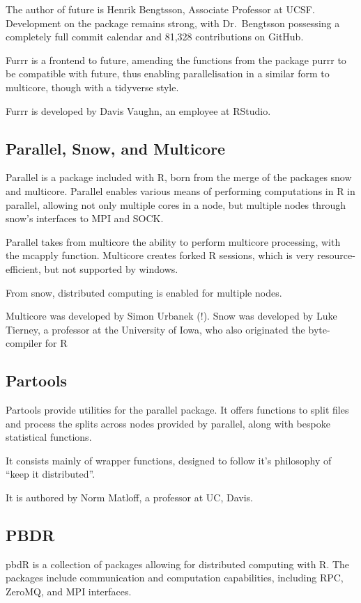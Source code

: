 \documentclass[10pt,a4paper]{article}
\begin{document}
The author of future is Henrik Bengtsson, Associate Professor at UCSF.
Development on the package remains strong, with Dr.~Bengtsson
possessing a completely full commit calendar and 81,328 contributions
on GitHub.

Furrr is a frontend to future, amending the functions from the package
purrr to be compatible with future, thus enabling parallelisation in a
similar form to multicore, though with a tidyverse style.

Furrr is developed by Davis Vaughn, an employee at RStudio.

\subsection{Parallel, Snow, and Multicore}
\label{sec:parall-snow-mult}
Parallel is a package included with R, born from the merge of the
packages snow and multicore. Parallel enables various means of
performing computations in R in parallel, allowing not only multiple
cores in a node, but multiple nodes through snow's interfaces to MPI
and SOCK.

Parallel takes from multicore the ability to perform multicore
processing, with the mcapply function. Multicore creates forked R
sessions, which is very resource-efficient, but not supported by
windows.

From snow, distributed computing is enabled for multiple nodes.

Multicore was developed by Simon Urbanek (!). Snow was developed by
Luke Tierney, a professor at the University of Iowa, who also
originated the byte-compiler for R

\subsection{Partools}
\label{sec:partools}
\nocite{matloff16:_softw_alchem}
Partools provide utilities for the parallel package. It offers
functions to split files and process the splits across nodes provided
by parallel, along with bespoke statistical functions.

It consists mainly of wrapper functions, designed to follow it's
philosophy of ``keep it distributed''.

It is authored by Norm Matloff, a professor at UC, Davis.

\subsection{PBDR}
\label{sec:pbdr}
\nocite{pbdBASEpackage}
\nocite{pbdBASEvignette}
pbdR is a collection of packages allowing for distributed computing
with R. The packages include communication and computation
capabilities, including RPC, ZeroMQ, and MPI interfaces.
\end{document}
